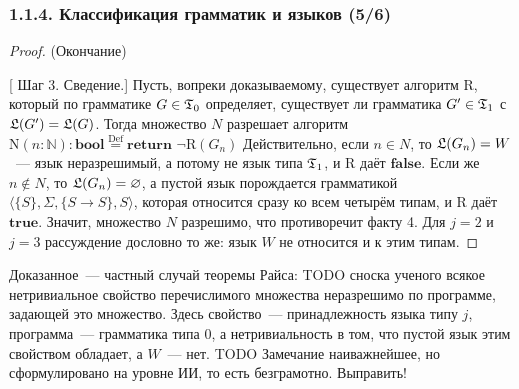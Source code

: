 \documentclass[mathserif,12pt,aspectratio=169]{beamer}
\let\emptyset\varnothing
\def\Def{\stackrel{\text{Def}}{=}}
\def\And{\operatorname{\,\&\,}}
\def\Not{\neg}
\let\Bbb\mathbb
\def\proofsection#1{\par{\color{brown}\sffamily\small  [\;}{\sffamily\small\color{brown} #1}{\sffamily\small\color{brown}\;]}\;}
\def\TODO#1{{\color{gray} TODO {#1}}}
\begin{document}
\begin{frame}
\frametitle{1.1.4. Классификация грамматик и языков (5/6)}

\begin{proof} (Окончание)
\proofsection{Шаг 3. Сведение.} Пусть, вопреки доказываемому, существует алгоритм
$\mathrm{R}$, который по грамматике $G\in\frak{T}_0$ определяет, существует ли
грамматика $G'\in\frak{T}_1$ с $\frak{L}(G')=\frak{L}(G)$. Тогда множество $N$
разрешает алгоритм
$\mathrm{N}(n:\Bbb{N}) : \textbf{bool} \Def
\textbf{return } \Not\mathrm{R}(G_n) $
Действительно, если $n\in N$, то $\frak{L}(G_n)=W$~--- язык неразрешимый, а
потому не язык типа $\frak{T}_1$, и $\mathrm{R}$ даёт $\textbf{false}$. 
Если же $n\not\in N$, то
$\frak{L}(G_n)=\emptyset$, а пустой язык порождается грамматикой
$\langle\{S\},\Sigma,\{S\to S\},S\rangle$, которая относится сразу ко всем
четырём типам, и $\mathrm{R}$ даёт $\textbf{true}$. Значит, множество $N$ разрешимо, что
противоречит факту 4. Для $j=2$ и $j=3$ рассуждение дословно то же: язык $W$ не
относится и к этим типам.
\end{proof}

\begin{remark}
Доказанное~--- частный случай теоремы Райса: \TODO{сноска ученого} всякое нетривиальное свойство
перечислимого множества неразрешимо по программе, задающей это множество. Здесь
свойство~--- принадлежность языка типу $j$, программа~--- грамматика типа 0, а
нетривиальность в том, что пустой язык этим свойством обладает, а $W$~--- нет.
\TODO{Замечание наиважнейшее, но сформулировано на уровне ИИ, то есть безграмотно. Выправить!}
\end{remark}
\end{frame}


%
\end{document}
